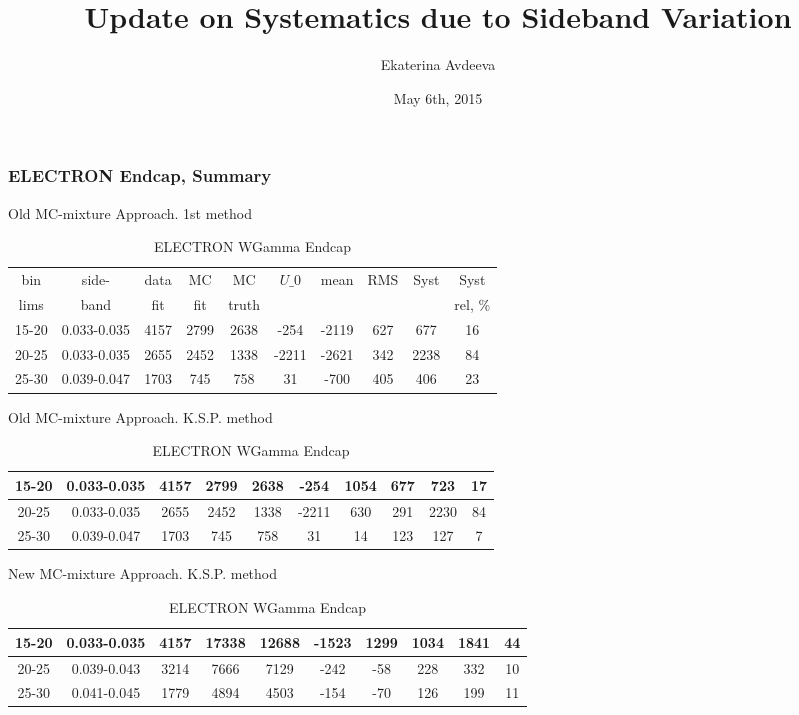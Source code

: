 \documentclass{beamer}
\title{Update on Systematics due to Sideband Variation}
\author{Ekaterina Avdeeva}
\institute{University of Nebraska - Lincoln}
\date{May 6th, 2015}
\begin{document}
\begin{frame}
\titlepage
\end{frame}

\begin{frame}\frametitle{ELECTRON Endcap, Summary}

\scriptsize Old MC-mixture Approach. 1st method
\begin{table}[h]
  \tiny
  \begin{center}
  \caption{ELECTRON WGamma Endcap}
  \begin{tabular}{|c|c|c|c|c|c|c|c|c|c|}
    bin & side- & data & MC & MC    & $U\_{0}$ & mean & RMS & Syst & Syst \\ 
    lims & band & fit & fit & truth &       &      &     &      & rel, \% \\ \hline
    15-20 & 0.033-0.035 & 4157 & 2799 & 2638 & -254 & -2119 & 627 & 677 & 16  \\ \hline
    20-25 & 0.033-0.035 & 2655 & 2452 & 1338 & -2211 & -2621 & 342 & 2238 & 84  \\ \hline
    25-30 & 0.039-0.047 & 1703 & 745 & 758 & 31 & -700 & 405 & 406 & 23  \\ \hline
  \end{tabular}
  \end{center}
\end{table}

\scriptsize Old MC-mixture Approach. K.S.P. method
\begin{table}[h]
  \tiny
  \begin{center}
  \caption{ELECTRON WGamma Endcap}
  \begin{tabular}{|c|c|c|c|c|c|c|c|c|c|}
    15-20 & 0.033-0.035 & 4157 & 2799 & 2638 & -254 & 1054 & 677 & 723 & 17  \\ \hline
    20-25 & 0.033-0.035 & 2655 & 2452 & 1338 & -2211 & 630 & 291 & 2230 & 84  \\ \hline
    25-30 & 0.039-0.047 & 1703 & 745 & 758 & 31 & 14 & 123 & 127 & 7  \\ \hline
  \end{tabular}
  \label{tab:systSbVar_Meth1_ELECTRON_WGamma_Endcap}
  \end{center}
\end{table}

\scriptsize New MC-mixture Approach. K.S.P. method
\begin{table}[h]
  	\tiny
  \begin{center}
  \caption{ELECTRON WGamma Endcap}
  \begin{tabular}{|c|c|c|c|c|c|c|c|c|c|}
    15-20 & 0.033-0.035 & 4157 & 17338 & 12688 & -1523 & 1299 & 1034 & 1841 & 44  \\ \hline
    20-25 & 0.039-0.043 & 3214 & 7666 & 7129 & -242 & -58 & 228 & 332 & 10  \\ \hline
    25-30 & 0.041-0.045 & 1779 & 4894 & 4503 & -154 & -70 & 126 & 199 & 11  \\ \hline
  \end{tabular}
  \label{tab:systSbVar_Meth1_ELECTRON_WGamma_Endcap}
  \end{center}
\end{table}
\end{frame}
\end{document}
